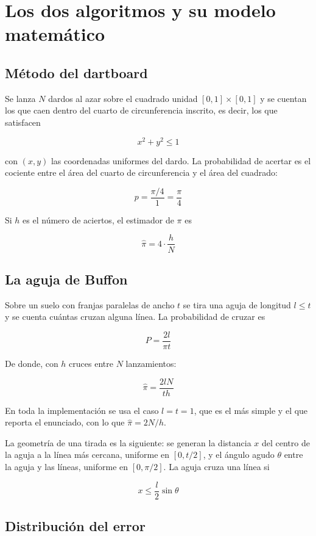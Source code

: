 \section{Los dos algoritmos y su modelo matemático}

\subsection{Método del dartboard}

Se lanza $N$ dardos al azar sobre el cuadrado unidad $[0,1] \times [0,1]$ y se cuentan los que caen dentro del cuarto de circunferencia inscrito, es decir, los que satisfacen

\[
x^2 + y^2 \leq 1
\]

con $(x, y)$ las coordenadas uniformes del dardo. La probabilidad de acertar es el cociente entre el área del cuarto de circunferencia y el área del cuadrado:

\[
p = \frac{\pi/4}{1} = \frac{\pi}{4}
\]

Si $h$ es el número de aciertos, el estimador de $\pi$ es

\[
\hat\pi = 4 \cdot \frac{h}{N}
\]

\subsection{La aguja de Buffon}

Sobre un suelo con franjas paralelas de ancho $t$ se tira una aguja de longitud $l \leq t$ y se cuenta cuántas cruzan alguna línea. La probabilidad de cruzar es

\[
P = \frac{2l}{\pi t}
\]

De donde, con $h$ cruces entre $N$ lanzamientos:

\[
\hat\pi = \frac{2lN}{th}
\]

En toda la implementación se usa el caso $l = t = 1$, que es el más simple y el que reporta el enunciado, con lo que $\hat\pi = 2N/h$.

La geometría de una tirada es la siguiente: se generan la distancia $x$ del centro de la aguja a la línea más cercana, uniforme en $[0, t/2]$, y el ángulo agudo $\theta$ entre la aguja y las líneas, uniforme en $[0, \pi/2]$. La aguja cruza una línea si

\[
x \leq \frac{l}{2} \sin\theta
\]

\subsection{Distribución del error}

